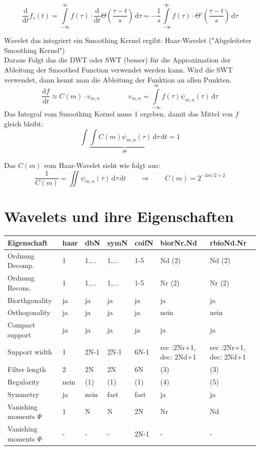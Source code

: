 \[ \frac{\mathrm{d}}{\mathrm{d}t}f_s(t) = \int\limits_{-\infty}^{\infty} f(\tau) \cdot \frac{\mathrm{d}}{\mathrm{d}t}\Theta(\frac{\tau - t}{s}) \, \mathrm{d}\tau = -\frac{1}{s} \int\limits_{-\infty}^{\infty} f(\tau) \cdot \Theta'(\frac{\tau - t}{s}) \, \mathrm{d}\tau \]

Wavelet das integriert ein Smoothing Kernel ergibt: Haar-Wavelet ("Abgeleiteter Smoothing Kernel")\\
Daraus Folgt das die DWT oder SWT (besser) für die Approximation der Ableitung der Smoothed Function verwendet werden kann. Wird die SWT verwendet, dann kennt man die Ableitung der Funktion an allen Punkten.
\[ 
	\frac{\mathrm{d}f}{\mathrm{d}t} \approx C(m) \cdot v_{m,n}
	\qquad \qquad
	v_{m,n} =  \int\limits_{-\infty}^{\infty} f(\tau) \psi_{m,n}(\tau) \, \mathrm{d}\tau 
\]
Das Integral vom Smoothing Kernel muss 1 ergeben, damit das Mittel von $f$ gleich bleibt: 
\[ \int \underbrace{\int C(m) \psi_{m,n}(\tau) \,\mathrm{d}\tau}_{\Theta} \,\mathrm{d}t = 1 \]

Das $C(m)$ vom Haar-Wavelet sieht wie folgt aus:
\[
	\frac{1}{C(m)} = \iint \psi_{m,n}(\tau) \,\mathrm{d}\tau \,\mathrm{d}t
	\qquad \Rightarrow \qquad  
	C(m)= 2^{-3m/2 + 2} 
\]

\clearpage
\section{Wavelets und ihre Eigenschaften}


\begin{tabular}{l||l|l|l|l|l|l}
	\textbf{Eigenschaft} & \textbf{haar} & \textbf{dbN}	& \textbf{symN}	& \textbf{coifN} & \textbf{biorNr.Nd}	& \textbf{rbioNd.Nr}	\\
	\hline
	\hline
	Ordnung Decomp.				& 1		& 1,...	& 1,...	& 1-5	& Nd (2)					& Nd (2)	\\
	\hline
	Ordnung Recons.				& 1		& 1,...	& 1,...	& 1-5	& Nr (2)					& Nr (2)	\\
	\hline
	Biorthgonality 				& ja	& ja	& ja	& ja	& ja						& ja		\\
	\hline
	Orthogonality 				& ja	& ja	& ja	& ja	& nein						& nein		\\
	\hline
	Compact support 			& ja 	& ja	& ja	& ja	& ja						& ja		\\
	\hline
	Support width 				& 1 	& 2N-1	& 2N-1	& 6N-1	& rec :2Nr+1, dec: 2Nd+1	& rec :2Nr+1, dec: 2Nd+1	\\
	\hline
	Filter length 				&  2 	& 2N	& 2N	& 6N	& (3) 						& (3)		\\
	\hline
	Regularity 					& nein 	& (1)	& (1)	& (1)	& (4)						& (5)	\\
	\hline
	Symmetry  					& ja 	& nein	& fast	& fast	& ja						& ja		\\
	\hline
	Vanishing moments $\Psi$ 	& 1		& 	N	&	N	& 2N	& Nr						& Nd		\\
	\hline
	Vanishing moments $\Phi$ 	& -		& 	-	&	-	& 2N-1	& - 						& -		\\
\end{tabular}

